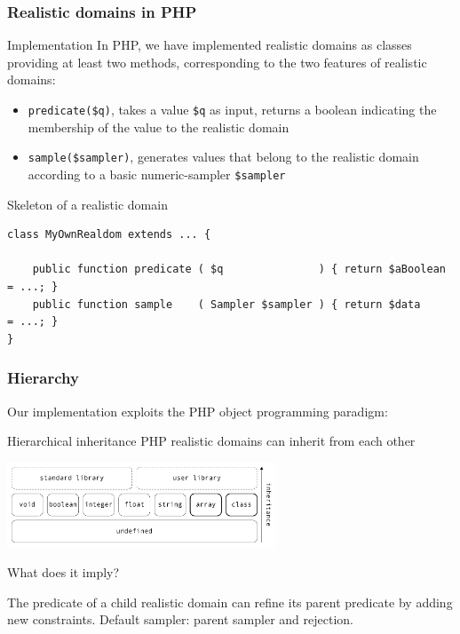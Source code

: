 \documentclass[10pt]{beamer}
\newcommand{\code}[1]{\texttt{#1}}
\begin{document}
\begin{frame}[fragile]
\frametitle{Realistic domains in PHP}

\begin{block}{Implementation}
In PHP, we have implemented realistic domains as classes providing at least two
methods, corresponding to the two features of realistic domains:
\begin{itemize}
\item \code{predicate(\$q)}, takes a value \code{\$q} as input, returns a
boolean indicating the membership of the value to the realistic domain
\item \code{sample(\$sampler)}, generates values that belong to the realistic
domain according to a basic numeric-sampler \code{\$sampler}
\end{itemize}
\end{block}

\begin{exampleblock}{Skeleton of a realistic domain}
{
\tiny
\begin{verbatim}
class MyOwnRealdom extends ... {

    public function predicate ( $q               ) { return $aBoolean = ...; }
    public function sample    ( Sampler $sampler ) { return $data     = ...; }
}
\end{verbatim}
}
\end{exampleblock}

\end{frame}

\begin{frame}
\frametitle{Hierarchy}

Our implementation exploits the PHP object programming paradigm:
\begin{block}{Hierarchical inheritance}
PHP realistic domains can inherit from each other
\begin{center}
\includegraphics[width=8cm]{Figures/Realdom_univers.pdf}
\end{center}
\end{block}

\begin{block}{What does it imply?}

The predicate of a child realistic domain can refine its parent predicate by
adding new constraints. Default sampler: parent sampler and rejection.

\end{block}

\end{frame}
\end{document}
